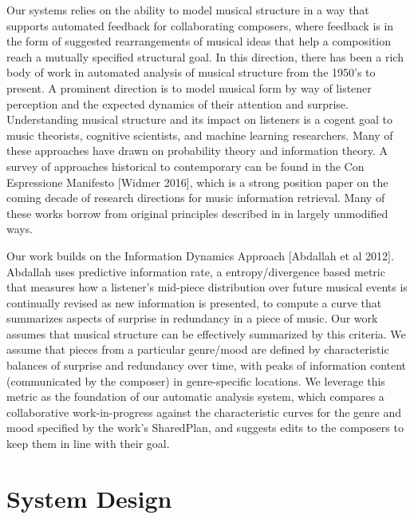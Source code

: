 \documentclass[final,authoryear,5p,times,twocolumn]{elsarticle}
\begin{document}
Our systems relies on the ability to model musical structure in a way that supports automated feedback for collaborating composers, where feedback is in the form of suggested rearrangements of musical ideas that help a composition reach a mutually specified structural goal. In this direction, there has been a rich body of work in automated analysis of musical structure from the 1950's to present. A prominent direction is to model musical form by way of listener perception and the expected dynamics of their attention and surprise. Understanding musical structure and its impact on listeners is a cogent goal to music theorists, cognitive scientists, and machine learning researchers. Many of these approaches have drawn on probability theory and information theory. A survey of approaches historical to contemporary can be found in the Con Espressione Manifesto [Widmer 2016], which is a strong position paper on the coming decade of research directions for music information retrieval. Many of these works borrow from original principles described in \cite{shannon} in largely unmodified ways.

Our work builds on the Information Dynamics Approach [Abdallah et al 2012]. Abdallah uses predictive information rate, a entropy/divergence based metric that measures how a listener's mid-piece distribution over future musical events is continually revised as new information is presented, to compute a curve that summarizes aspects of surprise in redundancy in a piece of music. Our work assumes that musical structure can be effectively summarized by this criteria. We assume that pieces from a particular genre/mood are defined by characteristic balances of surprise and redundancy over time, with peaks of information content (communicated by the composer) in genre-specific locations. We leverage this metric as the foundation of our automatic analysis system, which compares a collaborative work-in-progress against the characteristic curves for the genre and mood specified by the work's SharedPlan, and suggests edits to the composers to keep them in line with their goal.

\section{System Design}
\end{document}
